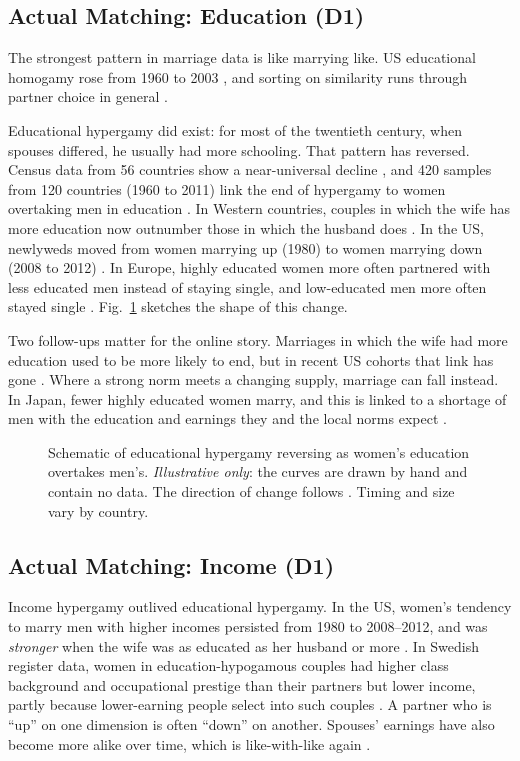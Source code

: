 \documentclass[conference,a4paper]{IEEEtran}
\begin{document}
\subsection{Actual Matching: Education (D1)}
The strongest pattern in marriage data is like marrying like. US educational homogamy rose from 1960 to 2003 \cite{schwartz2005}, and sorting on similarity runs through partner choice in general \cite{kalmijn1998}.

Educational hypergamy did exist: for most of the twentieth century, when spouses differed, he usually had more schooling. That pattern has reversed. Census data from 56 countries show a near-universal decline \cite{esteve2012}, and 420 samples from 120 countries (1960 to 2011) link the end of hypergamy to women overtaking men in education \cite{esteve2016}. In Western countries, couples in which the wife has more education now outnumber those in which the husband does \cite{vanbavel2018}. In the US, newlyweds moved from women marrying up (1980) to women marrying down (2008 to 2012) \cite{qian2017}. In Europe, highly educated women more often partnered with less educated men instead of staying single, and low-educated men more often stayed single \cite{dehauw2017}. Fig.~\ref{fig:reversal} sketches the shape of this change.

Two follow-ups matter for the online story. Marriages in which the wife had more education used to be more likely to end, but in recent US cohorts that link has gone \cite{schwartz2014}. Where a strong norm meets a changing supply, marriage can fall instead. In Japan, fewer highly educated women marry, and this is linked to a shortage of men with the education and earnings they and the local norms expect \cite{raymo2005}.

\begin{figure}[t]
\centering

\caption{Schematic of educational hypergamy reversing as women's education overtakes men's. \emph{Illustrative only}: the curves are drawn by hand and contain no data. The direction of change follows \cite{esteve2012,esteve2016,vanbavel2018,qian2017}. Timing and size vary by country.}
\label{fig:reversal}
\end{figure}

\subsection{Actual Matching: Income (D1)}
Income hypergamy outlived educational hypergamy. In the US, women's tendency to marry men with higher incomes persisted from 1980 to 2008--2012, and was \emph{stronger} when the wife was as educated as her husband or more \cite{qian2017}. In Swedish register data, women in education-hypogamous couples had higher class background and occupational prestige than their partners but lower income, partly because lower-earning people select into such couples \cite{chudnovskaya2020}. A partner who is ``up'' on one dimension is often ``down'' on another. Spouses' earnings have also become more alike over time, which is like-with-like again \cite{schwartz2010}.
\end{document}
